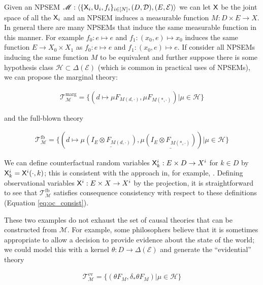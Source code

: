\begin{example}
Given an NPSEM $\mathscr{M}:\langle \{\mathsf{X}_i, \mathsf{U}_i, f_i\}_{i\in[N]}, (D,\mathcal{D}), (E,\mathcal{E})\rangle$ we can let $\mathsf{X}$ be the joint space of all the $\mathsf{X}_i$ and an NPSEM induces a measurable function $M:D\times E\to X$. In general there are many NPSEMs that induce the same measurable function in this manner. For example $f_0:e\mapsto e$ and $f_1:(x_0,e)\mapsto x_0$ induces the same function $E\to X_0\times X_1$ as $f_0:e\mapsto e$ and $f_1:(x_0,e)\mapsto e$. If consider all NPSEMs inducing the same function $M$ to be equivalent and further suppose there is some hypothesis class $\mathscr{H}\subset\Delta(\mathcal{E})$ (which is common in practical uses of NPSEMs), we can propose the marginal theory:

\begin{align}
    \mathscr{T}_{\mathscr{M}}^{\mathrm{marg}} = \{(d\mapsto \mu F_{M(d,\cdot)},\mu F_{M(*,\cdot)})|\mu\in \mathscr{H}\} 
\end{align}

and the full-blown theory

\begin{align}
        \mathscr{T}_{\mathscr{M}}^{\mathrm{fb}} = \{(d\mapsto \mu \underline{(I_E\otimes F_{M(d,\cdot)})},\mu \underline{(I_E\otimes F_{M(*,\cdot)})})|\mu\in \mathscr{H}\}
\end{align}

We can define counterfactual random variables $\mathsf{X}^i_k:E\times D\to X^i$ for $k\in D$ by $\mathsf{X}^i_k=\mathsf{X}^i(\cdot,k)$; this is consistent with the approach in, for example, \cite{balke_counterfactual_1994}. Defining observational variables $\mathsf{X}^i:E\times X\to X^i$ by the projection, it is straightforward to see that $\mathscr{T}^{\mathrm{fb}}_{\mathscr{M}}$ satisfies consequence consistency with respect to these definitions (Equation \ref{eq:oc_consist}).



These two examples do not exhaust the set of causal theories that can be constructed from $\mathscr{M}$. For example, some philosophers believe that it is sometimes appropriate to allow a decision to provide evidence about the state of the world; we could model this with a kernel $\theta:D\to \Delta(\mathcal{E})$ and generate the ``evidential'' theory

\begin{align}
        \mathscr{T}_{\mathscr{M}}^{\mathrm{ev}} = \{(\theta  F_{M},\delta_{*}\theta F_{M})|\mu\in \mathscr{H}\}
\end{align}

\end{example}

